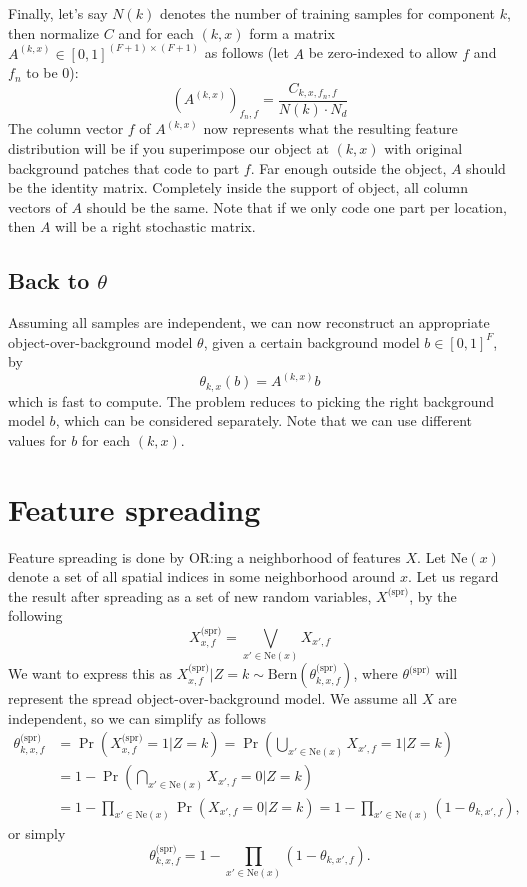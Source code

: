 \documentclass{article}
\newcommand{\Bern}[1]{\text{Bern}(#1)}
\begin{document}
Finally, let's say $N(k)$ denotes the number of training samples for component $k$, then normalize $C$ and for each $(k,x)$ form a matrix $A^{(k,x)} \in [0, 1]^{(F+1) \times (F+1)}$ as follows (let $A$ be zero-indexed to allow $f$ and $f_n$ to be 0):
\[
    (A^{(k,x)})_{f_n,f} = \frac{C_{k,x,f_n,f}}{N(k) \cdot N_d}
\]
The column vector $f$ of $A^{(k,x)}$ now represents what the resulting feature distribution will be if you superimpose our object at $(k,x)$ with original background patches that code to part $f$. Far enough outside the object, $A$ should be the identity matrix. Completely inside the support of object, all column vectors of $A$ should be the same. Note that if we only code one part per location, then $A$ will be a right stochastic matrix.


\subsection{Back to $\theta$}
Assuming all samples are independent, we can now reconstruct an appropriate object-over-background model $\theta$, given a certain background model $b \in [0, 1]^F$, by
\[
    \theta_{k,x}(b) = A^{(k,x)} b
\]
which is fast to compute. The problem reduces to picking the right background model $b$, which can be considered separately. Note that we can use different values for $b$ for each $(k,x)$. 


\section{Feature spreading}
\newcommand{\neigh}[1]{\text{Ne}(#1)}
\newcommand{\Ne}{\text{Ne}}
\newcommand{\spr}[1]{#1^{\text{(spr)}}}
\newcommand{\raw}[1]{#1^{\text{(raw)}}}

Feature spreading is done by OR:ing a neighborhood of features $X$. Let $\neigh{x}$ denote a set of all spatial indices in some neighborhood around $x$. Let us regard the result after spreading as a set of new random variables, $\spr{X}$, by the following
\[
    \spr{X}_{x,f} = \bigvee_{x' \in \neigh{x}} X_{x',f}
\]
%
We want to express this as $\spr{X}_{x,f} | Z = k \sim \Bern{\spr{\theta}_{k,x,f}}$, where $\spr{\theta}$ will represent the spread object-over-background model. We assume all $X$ are independent, so we can simplify as follows 
\begin{align*}
    \spr{\theta}_{k,x,f} &= \Pr(\spr{X}_{x,f} = 1 | Z = k) = \Pr(\bigcup_{x' \in \neigh{x}} X_{x',f} = 1 | Z = k) \\
    &= 1 - \Pr(\bigcap_{x' \in \neigh{x}} X_{x',f} = 0 | Z = k) \\
    &= 1 - \prod_{x' \in \neigh{x}} \Pr(X_{x',f} = 0 | Z = k) = 1 - \prod_{x' \in \neigh{x}} (1 - \theta_{k,x',f} ),
\end{align*}
or simply
\[
    \spr{\theta}_{k,x,f} = 1 - \prod_{x' \in \neigh{x}} (1 - \theta_{k,x',f}).
\]
\end{document}
